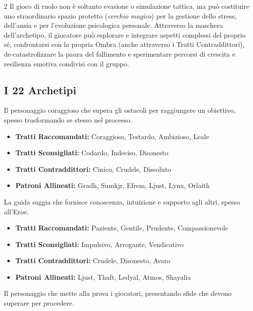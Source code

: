 \begin{multicols}{2}
Il gioco di ruolo non è soltanto evasione o simulazione tattica, ma può costituire uno straordinario spazio protetto (\emph{cerchio magico}) per la gestione dello stress, dell'ansia e per l'evoluzione psicologica personale. Attraverso la maschera dell'archetipo, il giocatore può esplorare e integrare aspetti complessi del proprio sé, confrontarsi con la propria Ombra (anche attraverso i Tratti Contraddittori), de-catastrofizzare la paura del fallimento e sperimentare percorsi di crescita e resilienza emotiva condivisi con il gruppo.

\subsection*{I 22 Archetipi}

Il personaggio coraggioso che supera gli ostacoli per raggiungere un obiettivo, spesso trasformando se stesso nel processo.

\noindent\begin{itemize}[leftmargin=*] \setlength{\itemsep}{0pt}
\item \textbf{Tratti Raccomandati:} Coraggioso, Testardo, Ambizioso, Leale
\item \textbf{Tratti Sconsigliati:} Codardo, Indeciso, Disonesto
\item \textbf{Tratti Contraddittori:} Cinico, Crudele, Dissoluto
\item \textbf{Patroni Allineati:} Gradh, Sumkjr, Efrem, Ljust, Lynx, Orlaith
\end{itemize}

La guida saggia che fornisce conoscenza, intuizione e supporto agli altri, spesso all'Eroe.

\noindent\begin{itemize}[leftmargin=*] \setlength{\itemsep}{0pt}
\item \textbf{Tratti Raccomandati:} Paziente, Gentile, Prudente, Compassionevole
\item \textbf{Tratti Sconsigliati:} Impulsivo, Arrogante, Vendicativo
\item \textbf{Tratti Contraddittori:} Crudele, Disonesto, Avaro
\item \textbf{Patroni Allineati:} Ljust, Thaft, Ledyal, Atmos, Shayalia
\end{itemize}

Il personaggio che mette alla prova i giocatori, presentando sfide che devono superare per procedere.


\end{multicols}
